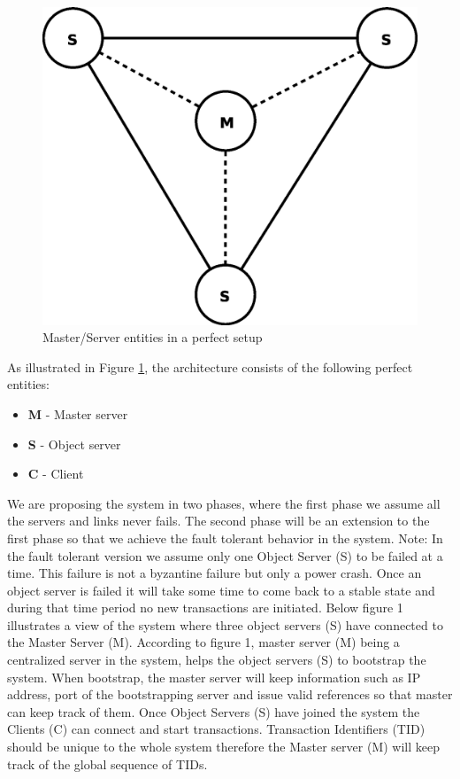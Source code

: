 \documentclass[times, 10pt,twocolumn]{article}
\begin{document}
\label{sec:arch}

\begin{figure}
\centering
\includegraphics[scale=0.3]{perfect.eps}
\caption{Master/Server entities in a perfect setup}
\label{fig:perf}
\end{figure}

As illustrated in Figure \ref{fig:perf}, the architecture consists of the 
following perfect entities: 
\begin{itemize}[noitemsep,nolistsep]
\item {\bf M} - Master server 
\item {\bf S} - Object server
\item {\bf C} - Client      
\end{itemize}

We are proposing the system in two phases, where the first phase we assume all the servers and links never fails. The second phase will be an extension to the first phase so that we achieve the fault
tolerant behavior in the system. Note: In the fault tolerant version we assume only one Object Server (S) to be failed at a time. This failure is not a byzantine failure but only a power crash.
Once an object server is failed it will take some time to come back to a stable state and during that time period no new transactions are initiated.
Below figure 1 illustrates a view of the system where three object servers (S) have connected to the Master Server (M).
\label{sec:phase1}
According to figure 1, master server (M) being a centralized server in the system, helps the object servers (S) to bootstrap the system. When bootstrap, the master server will keep information such as
IP address, port of the bootstrapping server and issue valid references so that master can keep track of them. Once Object Servers (S) have joined the system the Clients (C) can connect 
and start transactions. Transaction Identifiers (TID) should be unique to the whole system therefore the Master server (M) will keep track of the global sequence of TIDs.
\end{document}
